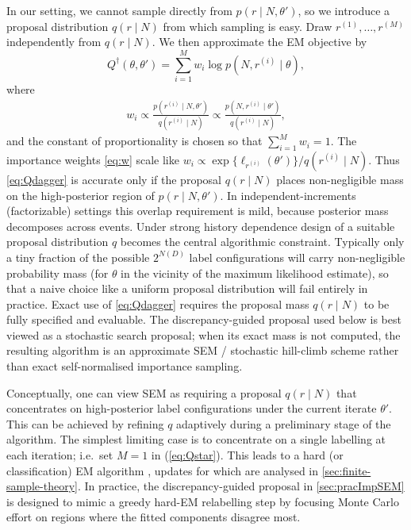 \documentclass{statsoc}
\newcommand{\1}{\mathbbm{1}}
\newcommand{\Nproc}{N}
\begin{document}
In our setting, we cannot sample directly from \(p(r\mid N,\theta')\), so we introduce a proposal distribution \(q(r\mid N)\) from which sampling is easy. Draw \(r^{(1)},\ldots,r^{(M)}\) independently from \(q(r\mid N)\). We then approximate the EM objective by
\begin{equation}
Q^\dagger(\theta,\theta') = \sum_{i=1}^M w_i \log p(N,r^{(i)}\mid \theta), \label{eq:Qdagger}
\end{equation}
where
\begin{align}
w_i \propto \frac{p(r^{(i)}\mid N,\theta')}{q(r^{(i)}\mid N)} 
    \propto \frac{p(N,r^{(i)}\mid \theta')}{q(r^{(i)}\mid N)}, \label{eq:w}
\end{align}
and the constant of proportionality is chosen so that \(\sum_{i=1}^M w_i=1\). The importance weights \eqref{eq:w} scale like
\(
w_i \propto \exp\{\ell_{r^{(i)}}(\theta')\}/q(r^{(i)}\mid \Nproc).
\)
Thus \eqref{eq:Qdagger} is accurate only if the proposal \(q(r\mid \Nproc)\) places non-negligible mass on the high-posterior region of \(p(r\mid \Nproc,\theta')\). In independent-increments (factorizable) settings this overlap requirement is mild, because posterior mass decomposes across events. Under strong history dependence design of a suitable proposal distribution $q$ becomes the central algorithmic constraint. Typically only a tiny fraction of the possible \(2^{\Nproc(D)}\) label configurations will carry non-negligible probability mass (for $\theta$ in the vicinity of the maximum likelihood estimate), so that a naive choice like a uniform proposal distribution will fail entirely in practice. Exact use of \eqref{eq:Qdagger} requires the proposal mass \(q(r\mid N)\) to be fully specified and evaluable. The discrepancy-guided proposal used below is best viewed as a stochastic search proposal; when its exact mass is not computed, the resulting algorithm is an approximate SEM / stochastic hill-climb scheme rather than exact self-normalised importance sampling.

Conceptually, one can view SEM as requiring a proposal \(q(r\mid N)\) that concentrates on high-posterior label configurations under the current iterate \(\theta'\). This can be achieved by refining \(q\) adaptively during a preliminary stage of the algorithm. The simplest limiting case is to concentrate on a single labelling at each iteration; i.e.\ set $M=1$ in (\ref{eq:Qstar}). This leads to a hard (or classification) EM algorithm \citep{celeux1992classification}, updates for which are analysed in \cref{sec:finite-sample-theory}. In practice, the discrepancy-guided proposal in \cref{sec:pracImpSEM} is designed to mimic a greedy hard-EM relabelling step by focusing Monte Carlo effort on regions where the fitted components disagree most. 
\end{document}
